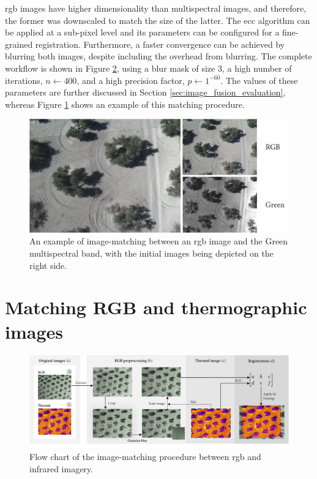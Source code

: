 \acrshort{rgb} images have higher dimensionality than multispectral images, and therefore, the former was downscaled to match the size of the latter. The \acrshort{ecc} algorithm can be applied at a sub-pixel level and its parameters can be configured for a fine-grained registration. Furthermore, a faster convergence can be achieved by blurring both images, despite including the overhead from blurring. The complete workflow is shown in Figure \ref{fig:thermal_registration}, using a blur mask of size 3, a high number of iterations, $n \gets 400$, and a high precision factor, $p \gets 1^{-60}$. The values of these parameters are further discussed in Section \ref{sec:image_fusion_evaluation}, whereas Figure \ref{fig:rgb_multi_registration_result} shows an example of this matching procedure.

\begin{figure}[ht]
    \centering
    \includegraphics{figs/image_fusion/rgb_multispectral_registration_result.png}
    \caption{An example of image-matching between an \acrshort{rgb} image and the Green multispectral band, with the initial images being depicted on the right side.}
    \label{fig:rgb_multi_registration_result}
\end{figure}

\section{Matching RGB and thermographic images}

\begin{figure}
    \includegraphics{figs/image_fusion/thermal_registration.png}
    \caption{Flow chart of the image-matching procedure between \acrshort{rgb} and infrared imagery.}
    \label{fig:thermal_registration}
\end{figure}


